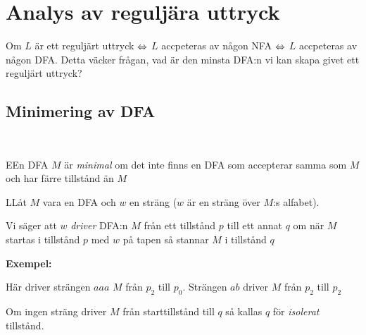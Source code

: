 \section{Analys av reguljära uttryck}\par
\noindent Om $L$ är ett reguljärt uttryck $\Leftrightarrow$ $L$ accpeteras av någon NFA $\Leftrightarrow$ $L$ accpeteras av någon DFA. Detta väcker frågan, vad är den minsta DFA:n vi kan skapa givet ett reguljärt uttryck?
\par\bigskip
\subsection{Minimering av DFA}\hfill\\\par
\begin{theo}
  EEn DFA $M$ är \textit{minimal} om det inte finns en DFA som accepterar samma som $M$ och har färre tillstånd än $M$
\end{theo}
\par\bigskip
\begin{theo}
  LLåt $M$ vara en DFA och $w$ en sträng ($w$ är en sträng över $M$:s alfabet).\par
  \noindent Vi säger att $w$ \textit{driver} DFA:n $M$ från ett tillstånd $p$ till ett annat $q$ om när $M$ startas i tillstånd $p$ med $w$ på tapen så stannar $M$ i tillstånd $q$ 
\end{theo}
\par\bigskip
\noindent\textbf{Exempel:}\par
\begin{figure}[ht!]
    \centering
    \caption{}
\end{figure}\par
\noindent Här driver strängen $aaa$ $M$ från $p_2$ till $p_0$. Strängen $ab$ driver $M$ från $p_2$ till $p_2$
\par\bigskip
\noindent Om ingen sträng driver $M$ från starttillstånd till $q$ så kallas $q$ för \textit{isolerat} tillstånd.
